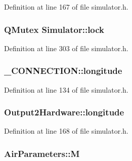 Definition at line 167 of file simulator.\-h.

\hypertarget{group___h_i_t_l_plugin_ga807f372f1fd1876041ae159adca0514b}{
\subsubsection[{lock}]{\setlength{\rightskip}{0pt plus 5cm}Q\-Mutex Simulator\-::lock\hspace{0.3cm}{\ttfamily [protected]}}}\label{group___h_i_t_l_plugin_ga807f372f1fd1876041ae159adca0514b}


Definition at line 303 of file simulator.\-h.

\hypertarget{group___h_i_t_l_plugin_gac60d13c120d3dd97309688a1d7f3d6d7}{
\subsubsection[{longitude}]{ \-\_\-\-C\-O\-N\-N\-E\-C\-T\-I\-O\-N\-::longitude}}\label{group___h_i_t_l_plugin_gac60d13c120d3dd97309688a1d7f3d6d7}


Definition at line 134 of file simulator.\-h.

\hypertarget{group___h_i_t_l_plugin_gacf92ed715333315d33a77f42aa1ed71e}{
\subsubsection[{longitude}]{ Output2\-Hardware\-::longitude}}\label{group___h_i_t_l_plugin_gacf92ed715333315d33a77f42aa1ed71e}


Definition at line 168 of file simulator.\-h.

\hypertarget{group___h_i_t_l_plugin_gaa24db2a922b9f638fdaacad6e3f4fb91}{
\subsubsection[{M}]{ Air\-Parameters\-::\-M}}\label{group___h_i_t_l_plugin_gaa24db2a922b9f638fdaacad6e3f4fb91}


